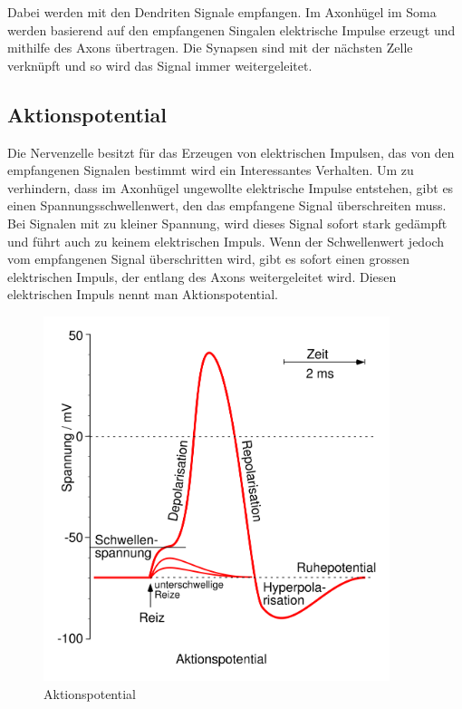 \begin{refsection}
\noindent
Dabei werden mit den Dendriten Signale empfangen. 
Im Axonhügel im Soma werden basierend auf den empfangenen Singalen elektrische Impulse erzeugt und mithilfe des Axons übertragen.
Die Synapsen sind mit der nächsten Zelle verknüpft und so wird das Signal immer weitergeleitet.

\subsection{Aktionspotential}
Die Nervenzelle besitzt für das Erzeugen von elektrischen Impulsen, das von den empfangenen Signalen bestimmt wird ein Interessantes Verhalten.
Um zu verhindern, dass im Axonhügel ungewollte elektrische Impulse entstehen, gibt es einen Spannungsschwellenwert,
den das empfangene Signal überschreiten muss.
Bei Signalen mit zu kleiner Spannung, wird dieses Signal sofort stark gedämpft und führt auch zu keinem elektrischen Impuls.
Wenn der Schwellenwert jedoch vom empfangenen Signal überschritten wird, gibt es sofort einen grossen elektrischen Impuls,
der entlang des Axons weitergeleitet wird. 
Diesen elektrischen Impuls nennt man Aktionspotential.
\begin{figure}[H]
    \centering
    \includegraphics[width=0.9\textwidth]{papers/nerven/Bilder/Aktionspotential.png}
    \caption{Aktionspotential}
    \label{fig:Aktionspotential}
\end{figure}

\end{refsection}
